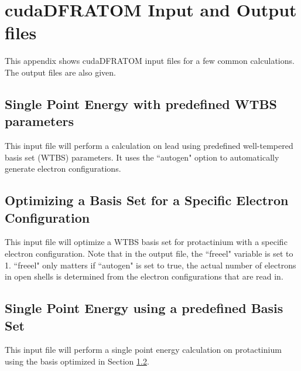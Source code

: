 \chapter{cudaDFRATOM Input and Output files}
\label{app:cudaDFRATOM_inp}

This appendix shows cudaDFRATOM input files for a few common calculations. The output files are also given.

\section{Single Point Energy with predefined WTBS parameters}
This input file will perform a calculation on lead using predefined well-tempered basis set (WTBS) parameters. It uses the ``autogen" option to automatically generate electron configurations.




\section{Optimizing a Basis Set for a Specific Electron Configuration}
\label{sec:opt_bs_spec}
This input file will optimize a WTBS basis set for protactinium with a specific electron configuration. Note that in the output file, the ``freeel" variable is set to 1. ``freeel" only matters if ``autogen" is set to true, the actual number of electrons in open shells is determined from the electron configurations that are read in.




\section{Single Point Energy using a predefined Basis Set}
This input file will perform a single point energy calculation on protactinium using the basis optimized in Section \ref{sec:opt_bs_spec}.


